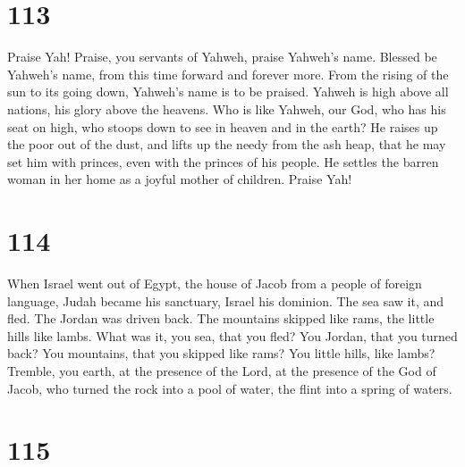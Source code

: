 \hypertarget{section-105}{%
\section{113}\label{section-105}}

 Praise Yah! Praise, you servants of Yahweh, praise
Yahweh's name.  Blessed be Yahweh's name, from this time
forward and forever more.  From the rising of the sun to
its going down, Yahweh's name is to be praised.  Yahweh is
high above all nations, his glory above the heavens.  Who
is like Yahweh, our God, who has his seat on high,  who
stoops down to see in heaven and in the earth?  He raises
up the poor out of the dust, and lifts up the needy from the ash heap,
 that he may set him with princes, even with the princes
of his people.  He settles the barren woman in her home as
a joyful mother of children. Praise Yah!

\hypertarget{section-106}{%
\section{114}\label{section-106}}

 When Israel went out of Egypt, the house of Jacob from a
people of foreign language,  Judah became his sanctuary,
Israel his dominion.  The sea saw it, and fled. The Jordan
was driven back.  The mountains skipped like rams, the
little hills like lambs.  What was it, you sea, that you
fled? You Jordan, that you turned back?  You mountains,
that you skipped like rams? You little hills, like lambs? 
Tremble, you earth, at the presence of the Lord, at the presence of the
God of Jacob,  who turned the rock into a pool of water,
the flint into a spring of waters.

\hypertarget{section-107}{%
\section{115}\label{section-107}}

